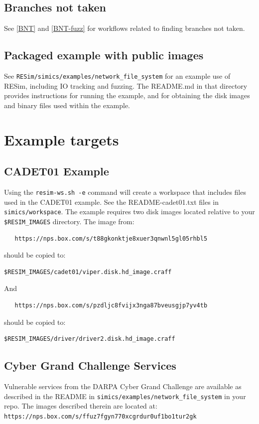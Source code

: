 \documentclass[titlepage]{article}
\begin{document}
\subsection{Branches not taken}
See \ref{BNT} and \ref{BNT-fuzz} for workflows related to finding branches not taken.

\subsection{Packaged example with public images}
See {\tt RESim/simics/examples/network\_file\_system} for an example use of RESim, including IO tracking and fuzzing.
The README.md in that directory provides instructions for running the example, and for obtaining the disk images
and binary files used within the example.

\section{Example targets}
\label{example-targets}
\subsection{CADET01 Example}
Using the {\tt resim-ws.sh -e} command will create a workspace that includes files used in the CADET01 example.
See the README-cadet01.txt files in {\tt simics/workspace}.
The example requires two disk images located relative to your {\tt \$RESIM\_IMAGES} directory.  The image from: 
\begin{verbatim}
   https://nps.box.com/s/t88gkonktje8xuer3qnwnl5gl05rhbl5
\end{verbatim}
\noindent should be copied to:
\begin{verbatim}
$RESIM_IMAGES/cadet01/viper.disk.hd_image.craff
\end{verbatim}
And
\begin{verbatim}
   https://nps.box.com/s/pzdljc8fvijx3nga87bveusgjp7yv4tb
\end{verbatim}
\noindent should be copied to:
\begin{verbatim}
$RESIM_IMAGES/driver/driver2.disk.hd_image.craff
\end{verbatim}

\subsection{Cyber Grand Challenge Services}
Vulnerable services from the DARPA Cyber Grand Challenge are available as described in the
README in {\tt simics/examples/network\_file\_system} in your repo.
The images described therein are located at: 
\newline
{\tt https://nps.box.com/s/ffuz7fgyn770xcgrdur0uf1bo1tur2gk}
\end{document}
